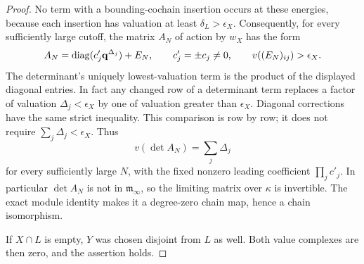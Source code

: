 \begin{proof}
No term with a bounding-cochain insertion occurs at these energies,
because each insertion has valuation at least
\(\delta_L>\epsilon_X\).
Consequently, for every sufficiently large cutoff, the matrix \(A_N\)
of action by \(w_X\) has the form
\[
 A_N=\operatorname{diag}(c'_j\mathbf q^{\Delta_j})+E_N,
 \qquad c'_j=\pm c_j\ne0,\qquad
 v((E_N)_{ij})>\epsilon_X.
\]
The determinant's uniquely lowest-valuation term is the product of the
displayed diagonal entries.  In fact any changed row of a determinant
term replaces a factor of valuation \(\Delta_j<\epsilon_X\) by one of
valuation greater than \(\epsilon_X\).  Diagonal corrections have the
same strict inequality.  This comparison is row by row; it does not
require \(\sum_j\Delta_j<\epsilon_X\).
Thus
\[
 v(\det A_N)=\sum_j\Delta_j
\]
for every sufficiently large \(N\), with the fixed nonzero leading
coefficient \(\prod_j c'_j\).  In particular \(\det A_N\) is not in
\(\mathfrak m_\infty\), so the limiting matrix over \(\kappa\) is
invertible.  The exact module identity makes it a degree-zero chain
map, hence a chain isomorphism.

If \(X\cap L\) is empty, \(Y\) was chosen disjoint from \(L\) as well.
Both value complexes are then zero, and the assertion holds.
\end{proof}
